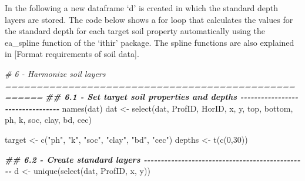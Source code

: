 \documentclass[
  10pt,
  b5paper,
  oneside]{book}
\newenvironment{Shaded}{\begin{snugshade}}{\end{snugshade}}
\newcommand{\CommentTok}[1]{\textcolor[rgb]{0.56,0.35,0.01}{\textit{#1}}}
\newcommand{\DecValTok}[1]{\textcolor[rgb]{0.00,0.00,0.81}{#1}}
\newcommand{\DocumentationTok}[1]{\textcolor[rgb]{0.56,0.35,0.01}{\textbf{\textit{#1}}}}
\newcommand{\FunctionTok}[1]{\textcolor[rgb]{0.00,0.00,0.00}{#1}}
\newcommand{\NormalTok}[1]{#1}
\newcommand{\OtherTok}[1]{\textcolor[rgb]{0.56,0.35,0.01}{#1}}
\newcommand{\StringTok}[1]{\textcolor[rgb]{0.31,0.60,0.02}{#1}}
\begin{document}
In the following a new dataframe `d' is created in which the standard depth layers are stored. The code below shows a for loop that calculates the values for the standard depth for each target soil property automatically using the ea\_spline function of the `ithir' package. The spline functions are also explained in {[}Format requirements of soil data{]}.

\begin{Shaded}
\begin{Highlighting}[]
\CommentTok{\# 6 {-} Harmonize soil layers ====================================================}
\DocumentationTok{\#\# 6.1 {-} Set target soil properties and depths {-}{-}{-}{-}{-}{-}{-}{-}{-}{-}{-}{-}{-}{-}{-}{-}{-}{-}{-}{-}{-}{-}{-}{-}{-}{-}{-}{-}{-}{-}{-}{-}{-}}
\FunctionTok{names}\NormalTok{(dat)}
\NormalTok{dat }\OtherTok{\textless{}{-}} \FunctionTok{select}\NormalTok{(dat, ProfID, HorID, x, y, top, bottom, ph, k, soc, clay, bd, cec)}

\NormalTok{target }\OtherTok{\textless{}{-}} \FunctionTok{c}\NormalTok{(}\StringTok{"ph"}\NormalTok{, }\StringTok{"k"}\NormalTok{, }\StringTok{"soc"}\NormalTok{, }\StringTok{"clay"}\NormalTok{, }\StringTok{"bd"}\NormalTok{, }\StringTok{"cec"}\NormalTok{)}
\NormalTok{depths }\OtherTok{\textless{}{-}} \FunctionTok{t}\NormalTok{(}\FunctionTok{c}\NormalTok{(}\DecValTok{0}\NormalTok{,}\DecValTok{30}\NormalTok{))}

\DocumentationTok{\#\# 6.2 {-} Create standard layers {-}{-}{-}{-}{-}{-}{-}{-}{-}{-}{-}{-}{-}{-}{-}{-}{-}{-}{-}{-}{-}{-}{-}{-}{-}{-}{-}{-}{-}{-}{-}{-}{-}{-}{-}{-}{-}{-}{-}{-}{-}{-}{-}{-}{-}{-}{-}{-}}
\NormalTok{d }\OtherTok{\textless{}{-}} \FunctionTok{unique}\NormalTok{(}\FunctionTok{select}\NormalTok{(dat, ProfID, x, y))}


\end{Highlighting}
\end{Shaded}
\end{document}
